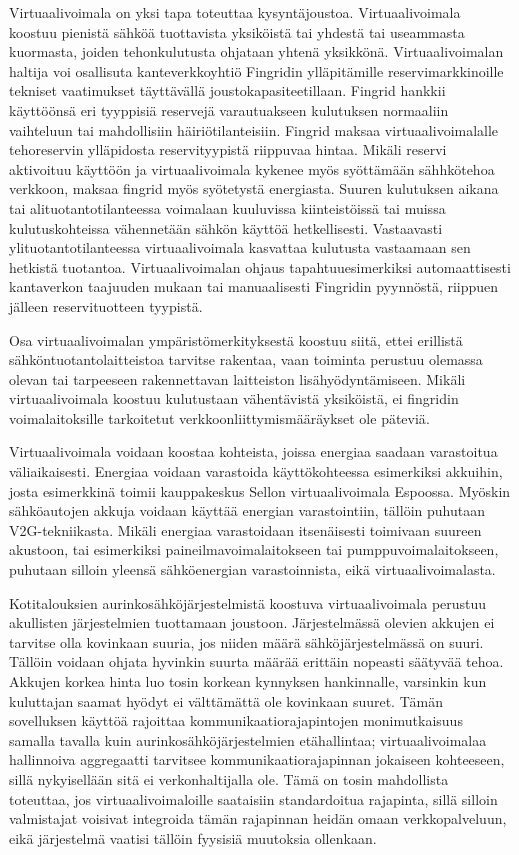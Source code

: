   Virtuaalivoimala on yksi tapa toteuttaa kysyntäjoustoa. Virtuaalivoimala koostuu pienistä sähköä tuottavista yksiköistä tai yhdestä tai useammasta kuormasta, joiden tehonkulutusta ohjataan yhtenä yksikkönä. Virtuaalivoimalan haltija voi osallisuta kanteverkkoyhtiö Fingridin ylläpitämille reservimarkkinoille tekniset vaatimukset täyttävällä joustokapasiteetillaan. Fingrid hankkii käyttöönsä eri tyyppisiä reservejä varautuakseen kulutuksen normaaliin vaihteluun tai mahdollisiin häiriötilanteisiin. Fingrid maksaa virtuaalivoimalalle tehoreservin ylläpidosta reservityypistä riippuvaa hintaa. Mikäli reservi aktivoituu käyttöön ja virtuaalivoimala kykenee myös syöttämään sähhkötehoa verkkoon, maksaa fingrid myös syötetystä energiasta. Suuren kulutuksen aikana tai alituotantotilanteessa voimalaan kuuluvissa kiinteistöissä tai muissa kulutuskohteissa vähennetään sähkön käyttöä hetkellisesti. Vastaavasti ylituotantotilanteessa virtuaalivoimala kasvattaa kulutusta vastaamaan sen hetkistä tuotantoa. Virtuaalivoimalan ohjaus tapahtuuesimerkiksi automaattisesti kantaverkon taajuuden mukaan tai manuaalisesti Fingridin pyynnöstä, riippuen jälleen reservituotteen tyypistä.\parencite{fingrid, reserviLaki}

  Osa virtuaalivoimalan ympäristömerkityksestä koostuu siitä, ettei erillistä sähköntuotantolaitteistoa tarvitse rakentaa, vaan toiminta perustuu olemassa olevan tai tarpeeseen rakennettavan laitteiston lisähyödyntämiseen. Mikäli virtuaalivoimala koostuu kulutustaan vähentävistä yksiköistä, ei fingridin voimalaitoksille tarkoitetut verkkoonliittymismääräykset ole päteviä\parencite{VJV2018}.

  Virtuaalivoimala voidaan koostaa kohteista, joissa energiaa saadaan varastoitua väliaikaisesti. Energiaa voidaan varastoida käyttökohteessa esimerkiksi akkuihin, josta esimerkkinä toimii kauppakeskus Sellon virtuaalivoimala Espoossa\parencite{sello}. Myöskin sähköautojen akkuja voidaan käyttää energian varastointiin, tällöin puhutaan \gls{V2G}-tekniikasta\parencite{dictOfEnergy}. Mikäli energiaa varastoidaan itsenäisesti toimivaan suureen akustoon, tai esimerkiksi paineilmavoimalaitokseen tai pumppuvoimalaitokseen, puhutaan silloin yleensä sähköenergian varastoinnista, eikä virtuaalivoimalasta\parencite{dictOfEnergy}.

  Kotitalouksien aurinkosähköjärjestelmistä koostuva virtuaalivoimala perustuu akullisten järjestelmien tuottamaan joustoon. Järjestelmässä olevien akkujen ei tarvitse olla kovinkaan suuria, jos niiden määrä sähköjärjestelmässä on suuri. Tällöin voidaan ohjata hyvinkin suurta määrää erittäin nopeasti säätyvää tehoa. Akkujen korkea hinta luo tosin korkean kynnyksen hankinnalle, varsinkin kun kuluttajan saamat hyödyt ei välttämättä ole kovinkaan suuret. Tämän sovelluksen käyttöä rajoittaa kommunikaatiorajapintojen monimutkaisuus samalla tavalla kuin aurinkosähköjärjestelmien etähallintaa; virtuaalivoimalaa hallinnoiva aggregaatti tarvitsee kommunikaatiorajapinnan jokaiseen kohteeseen, sillä nykyisellään sitä ei verkonhaltijalla ole. Tämä on tosin mahdollista toteuttaa, jos virtuaalivoimaloille saataisiin standardoitua rajapinta, sillä silloin valmistajat voisivat integroida tämän rajapinnan heidän omaan verkkopalveluun, eikä järjestelmä vaatisi tällöin fyysisiä muutoksia ollenkaan.

